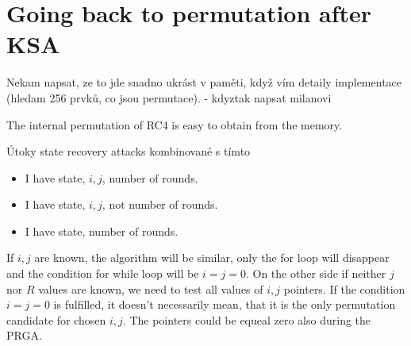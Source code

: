 \chapter{Going back to permutation after KSA}
Nekam napsat, ze to jde snadno ukrást v paměti, když vím detaily implementace (hledam 256 prvků, co jsou permutace). - kdyztak napsat milanovi


The internal permutation of RC4 is easy to obtain from the memory. 

Útoky state recovery attacks kombinované s tímto


\begin{itemize}
	\item I have state, $ i,j $, number of rounds. 
	\item I have state, $ i,j $, not number of rounds. 
	\item I have state, number of rounds. 
\end{itemize}



\begin{algorithm}[]
	
	
\end{algorithm}

If $ i,j $ are known, the algorithm will be similar, only the for loop will disappear and the condition for while loop will be $ i = j = 0 $. On the other side if neither $ j $ nor $ R $ values are known, we need to test all values of $ i,j $ pointers. If the condition $ i = j = 0 $ is fulfilled, it doesn't necessarily mean, that it is the only permutation candidate for chosen $ i,j $. The pointers could be equeal zero also during the PRGA. 